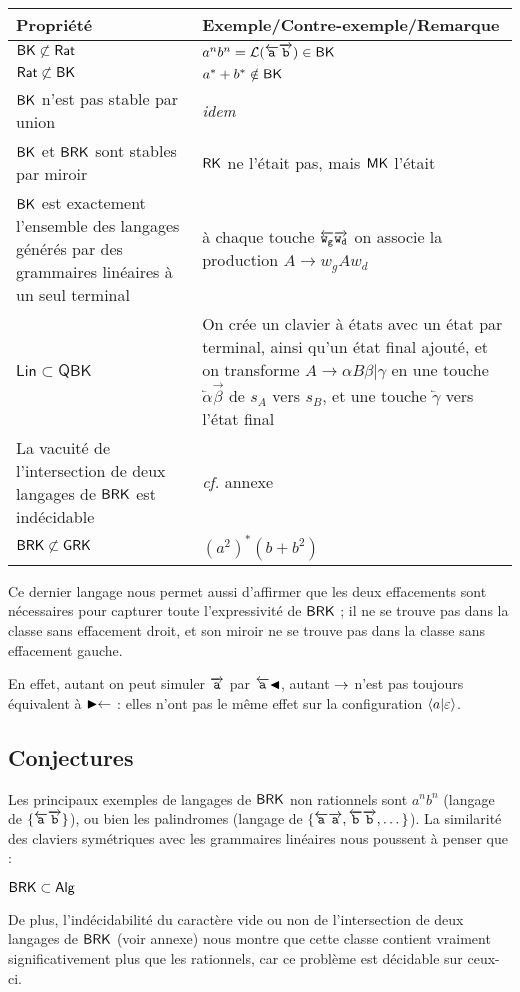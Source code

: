 \documentclass[12pt, a4paper]{article}
\renewcommand{\L}{\mathcal{L}}
\begin{document}
    \begin{tabular}{|p{}|p{}|}
        \hline
        \textbf{Propriété} & \textbf{Exemple/Contre-exemple/Remarque} \\
        \hline
        $\mathsf{BK} \not\subset \mathsf{Rat}$ & $a^nb^n = \L({\egauche{a}\edroite{b}}) \in \BK$ \\
        \hline
        $\mathsf{Rat} \not\subset \mathsf{BK}$ & $a^*+b^* \notin \mathsf{BK}$ \\
        \hline
        $\mathsf{BK}$ n'est pas stable par union & \textit{idem} \\
        \hline
        $\mathsf{BK}$ et $\mathsf{BRK}$ sont stables par miroir & $\mathsf{RK}$ ne l'était pas, mais $\mathsf{MK}$ l'était \\
        \hline
        $\mathsf{BK}$ est exactement l'ensemble des langages générés par des grammaires linéaires à un seul terminal & à chaque touche $\overleftarrow{\mathtt{w_g}}\overrightarrow{\mathtt{w_d}}$ on associe la production $A \rightarrow w_gAw_d$ \\
        \hline
        $\mathsf{Lin} \subset \mathsf{QBK}$ & On crée un clavier à états avec un état par terminal, ainsi qu'un état final ajouté, et on transforme $A \rightarrow \alpha B \beta | \gamma$ en une touche $\overleftarrow{\alpha}\overrightarrow{\beta}$ de $s_A$ vers $s_B$, et une touche $\overleftarrow{\gamma}$ vers l'état final \\
        \hline
        La vacuité de l'intersection de deux langages de $\mathsf{BRK}$ est indécidable & \textit{cf.} annexe \\
        \hline
        $\mathsf{BRK} \not\subset \mathsf{GRK}$ & $(a^2)^*(b+b^2)$ \\
        \hline
    \end{tabular}

    
    Ce dernier langage nous permet aussi d'affirmer que les deux effacements sont nécessaires pour capturer toute l'expressivité de $\mathsf{BRK}$ ; il ne se trouve pas dans la classe sans effacement droit, et son miroir ne se trouve pas dans la classe sans effacement gauche.

    En effet, autant on peut simuler $\overrightarrow{\mathtt{a}}$ par $\overleftarrow{\mathtt{a}} \mathord{\blacktriangleleft}$, autant $\mathord{\rightarrow}$ n'est pas toujours équivalent à $\mathord{\blacktriangleright}\mathord{\leftarrow}$ : elles n'ont pas le même effet sur la configuration $\left\langle a \middle| \varepsilon \right\rangle$.
         
    \subsection{Conjectures}\label{sectionclavsym}
    Les principaux exemples de langages de $\mathsf{BRK}$ non rationnels sont $a^nb^n$ (langage de $\{\overleftarrow{\mathtt{a}}\overrightarrow{\mathtt{b}}\}$), ou bien les palindromes (langage de $\{\overleftarrow{\mathtt{a}}\overrightarrow{\mathtt{a}},\overleftarrow{\mathtt{b}}\overrightarrow{\mathtt{b}}, \dots\}$). La similarité des claviers symétriques avec les grammaires linéaires nous poussent à penser que :
    \begin{example}[Conjecture 1]
        $\mathsf{BRK} \subset \mathsf{Alg}$
    \end{example}
    De plus, l'indécidabilité du caractère vide ou non de l'intersection de deux langages de $\mathsf{BRK}$ (voir annexe) nous montre que cette classe contient vraiment significativement plus que les rationnels, car ce problème est décidable sur ceux-ci.
    
\end{document}

